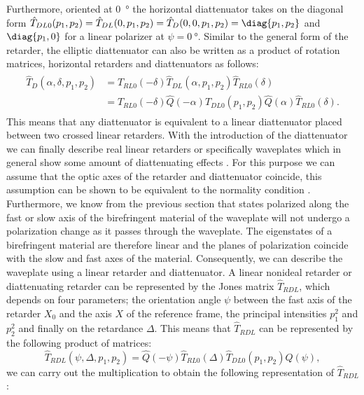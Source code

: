 Furthermore, oriented at \SI{0}{\degree} the horizontal diattenuator takes on the diagonal form $\hat{T}_{DL0}(p_1, p_2) = \hat{T}_{DL}(0, p_1, p_2)=\hat{T}_{D}(0,0,p_1,p_2)=\diag{p_1, p_2}$ and $\diag{p_1, 0}$ for a linear polarizer at $\psi = \SI{0}{\degree}$. Similar to the general form of the retarder, the elliptic diattenuator can also be written as a product of rotation matrices, horizontal retarders and diattenuators as follows:
\begin{align}
\begin{split}
    \hat{T}_{D}(\alpha, \delta, p_1, p_2) 
    &= \hat{T}_{RL0}(-\delta)\hat{T}_{DL}(\alpha, p_1, p_2)\hat{T}_{RL0}(\delta) \\
    &= \hat{T}_{RL0}(-\delta)\hat{Q}(-\alpha)\hat{T}_{DL0}(p_1, p_2)\hat{Q}(\alpha)\hat{T}_{RL0}(\delta).
\end{split}
\end{align}
This means that any diattenuator is equivalent to a linear diattenuator placed between two crossed linear retarders. With the introduction of the diattenuator we can finally describe real linear retarders or specifically waveplates which in general show some amount of diattenuating effects \cite{D.CLARKE1971}. For this purpose we can assume that the optic axes of the retarder and diattenuator coincide, this assumption can be shown to be equivalent to the normality condition \cite{Bass1995}. Furthermore, we know from the previous section that states polarized along the fast or slow axis of the birefringent material of the waveplate will not undergo a polarization change as it passes through the waveplate. The eigenstates of a birefringent material are therefore linear and the planes of polarization coincide with the slow and fast axes of the material. Consequently, we can describe the waveplate using a linear retarder and diattenuator. A linear nonideal retarder or diattenuating retarder can be represented by the Jones matrix $\hat{T}_{RDL}$, which depends on four parameters; the orientation angle $\psi$ between the fast axis of the retarder $X_0$ and the axis $X$ of the reference frame, the principal intensities $p_1^2$ and $p_2^2$ and finally on the retardance $\Delta$. This means that $\hat{T}_{RDL}$ can be represented by the following product of matrices:
\begin{equation}
    \hat{T}_{RDL}(\psi, \Delta, p_1, p_2) = \hat{Q}(-\psi)\hat{T}_{RL0}(\Delta)\hat{T}_{DL0}(p_1, p_2)\hat{Q}(\psi),
\end{equation}
we can carry out the multiplication to obtain the following representation of $\hat{T}_{RDL}$:
